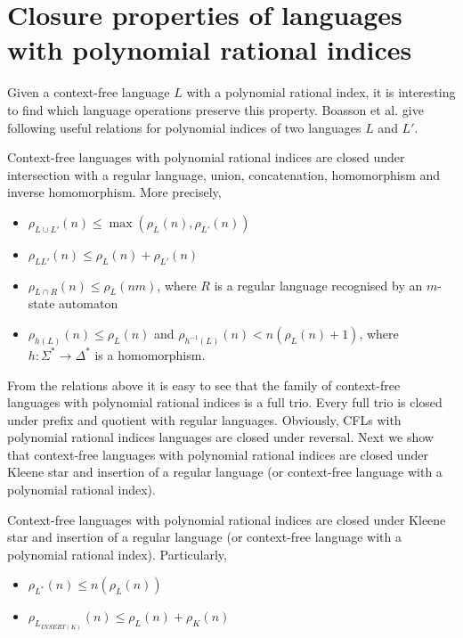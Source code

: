 \section{Closure properties of languages with polynomial rational indices}
\label{sec:closure}
Given a context-free language $L$ with a polynomial rational index, it is interesting to find which language operations preserve this property.  Boasson et al. \cite{RatBasic} give following useful relations for polynomial indices of two languages $L$ and $L'$.
\begin{theorem}
Context-free languages with polynomial rational indices are closed under intersection with a regular language, union, concatenation, homomorphism and inverse homomorphism. More precisely,
\begin{itemize}
\item $\rho_{L \cup L'}(n) \le  \max{(\rho_L(n), \rho_{L'}(n))} $
\item $\rho_{LL'}(n) \le \rho_L(n) + \rho_{L'}(n)$
\item $\rho_{L \cap R}(n) \le \rho_L(nm)$, where $R$ is a regular language recognised by an $m$-state automaton
\item $\rho_{h(L)}(n) \le \rho_L(n)$ and $\rho_{h^{-1}(L)}(n) < n(\rho_L(n) +1)$, where $h: \Sigma^* \rightarrow \Delta^*$ is a homomorphism.
\end{itemize}
\end{theorem}
From the relations above it is easy to see that the family of context-free languages with polynomial rational indices is a full trio. Every full trio is closed under prefix and quotient with regular languages. Obviously, CFLs with polynomial rational indices languages are closed under reversal.  Next we show that context-free languages with polynomial rational indices are closed under Kleene star and insertion of a regular language (or context-free language with a polynomial rational index).
\begin{theorem}
Context-free languages with polynomial rational indices are closed under Kleene star and insertion of a regular language  (or context-free language with a polynomial rational index). Particularly,
\begin{itemize}
\item $\rho_{L^{*}}(n) \le n(\rho_L(n))$
\item $\rho_{L_{INSERT(K)}}(n) \le \rho_L(n) + \rho_{K}(n)$
\end{itemize}
\end{theorem}
